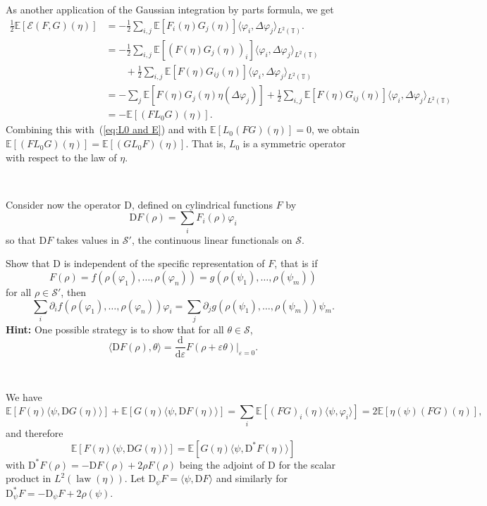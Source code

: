 \documentclass[a4paper,11pt]{article}
\newcommand{\mathD}{\mathrm{D}}
\newcommand{\mathd}{\mathrm{d}}
\newcommand{\tmop}[1]{\ensuremath{\operatorname{#1}}}
\newcommand{\tmtextbf}[1]{{\bfseries{#1}}}
\newcommand{\CS}{\mathscr{S}}
\begin{document}
As another application of the Gaussian integration by parts formula, we get
\begin{align*}
  \frac{1}{2} \mathbb{E} [\mathcal{E} (F, G) (\eta)] & = - \frac{1}{2} \sum_{i, j} \mathbb{E} [F_i (\eta) G_j (\eta)] \langle \varphi_i, \Delta \varphi_j \rangle_{L^2 (\mathbb{T})} . \\
   & = - \frac{1}{2} \sum_{i, j} \mathbb{E} [(F (\eta) G_j (\eta))_i] \langle \varphi_i, \Delta \varphi_j \rangle_{L^2 (\mathbb{T})} \\
   &\qquad + \frac{1}{2}  \sum_{i, j} \mathbb{E} [F (\eta) G_{i j} (\eta)] \langle \varphi_i, \Delta \varphi_j \rangle_{L^2 (\mathbb{T})} \\
   & = - \sum_j \mathbb{E} [F (\eta) G_j (\eta) \eta (\Delta \varphi_j)] + \frac{1}{2} \sum_{i, j} \mathbb{E} [F (\eta) G_{i j} (\eta)] \langle \varphi_i, \Delta \varphi_j \rangle_{L^2 (\mathbb{T})} \\
   & = -\mathbb{E} [(FL_0 G) (\eta)].
\end{align*}
Combining this with~(\ref{eq:L0 and E}) and with $\mathbb{E} [L_0 (F G)
(\eta)] = 0$, we obtain $\mathbb{E} [(FL_0 G) (\eta)] =\mathbb{E} [(GL_0 F)
(\eta)]$. That is, $L_0$ is a symmetric operator with respect to the law of
$\eta$.

\

Consider now the operator $\mathD$, defined on cylindrical functions $F$ by
\begin{equation}
  \mathD F (\rho) = \sum_i F_i (\rho) \varphi_i
\end{equation}
so that $\mathD F$ takes values in $\CS'$, the continuous linear functionals
on $\CS$.

\begin{exercise}
  Show that $\mathD$ is independent of the specific representation of $F$,
  that is if
  \[ F (\rho) = f (\rho (\varphi_1), \ldots, \rho (\varphi_n)) = g (\rho
     (\psi_1), \ldots, \rho (\psi_m)) \]
  for all $\rho \in \CS'$, then
  \[ \sum_i \partial_i f (\rho (\varphi_1), \ldots, \rho (\varphi_n))
     \varphi_i = \sum_j \partial_j g (\rho (\psi_1), \ldots, \rho (\psi_m))
     \psi_m . \]
  \tmtextbf{Hint:} One possible strategy is to show that for all $\theta \in
  \CS$,
  \[ \langle \mathD F (\rho), \theta \rangle = \frac{\mathd}{\mathd
     \varepsilon} F (\rho + \varepsilon \theta) |_{\varepsilon = 0} . \]
\end{exercise}

\

We have
\[ \mathbb{E} [F (\eta) \langle \psi, \mathD G (\eta) \rangle] +\mathbb{E}
   [G (\eta) \langle \psi, \mathD F (\eta) \rangle] = \sum_i \mathbb{E} [(F
   G)_i (\eta) \langle \psi, \varphi_i \rangle] = 2\mathbb{E} [\eta (\psi)
   (FG) (\eta)], \]
and therefore
\[ \mathbb{E} [F (\eta) \langle \psi, \mathD G (\eta) \rangle] =\mathbb{E}
   [G (\eta) \langle \psi, \mathD^{\ast} F (\eta) \rangle] \]
with $\mathD^{\ast} F (\rho) = - \mathD F (\rho) + 2 \rho F (\rho)$ being the
adjoint of $\mathD$ for the scalar product in $L^2 (\tmop{law} (\eta))$. Let
$\mathD_{\psi} F = \langle \psi, \mathD F \rangle$ and similarly for
$\mathD^{\ast}_{\psi} F = - \mathD_{\psi} F + 2 \rho (\psi)$.
\end{document}

